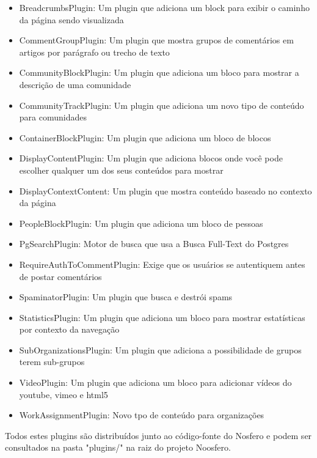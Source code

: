 \documentclass[11pt]{article}
\begin{document}
\begin{itemize}
  \item BreadcrumbsPlugin: Um plugin que adiciona um block para exibir o
    caminho da página sendo visualizada
  \item CommentGroupPlugin: Um plugin que mostra grupos de comentários em
    artigos por parágrafo ou trecho de texto
  \item CommunityBlockPlugin: Um plugin que adiciona um bloco para mostrar a
    descrição de uma comunidade
  \item CommunityTrackPlugin: Um plugin que adiciona um novo tipo de conteúdo
    para comunidades
  \item ContainerBlockPlugin: Um plugin que adiciona um bloco de blocos
  \item DisplayContentPlugin: Um plugin que adiciona blocos onde você pode
    escolher qualquer um dos seus conteúdos para mostrar
  \item DisplayContextContent: Um plugin que mostra conteúdo baseado no
    contexto da página
  \item PeopleBlockPlugin: Um plugin que adiciona um bloco de pessoas
  \item PgSearchPlugin: Motor de busca que usa a Busca Full-Text do Postgres
  \item RequireAuthToCommentPlugin: Exige que os usuários se autentiquem antes
    de postar comentários
  \item SpaminatorPlugin: Um plugin que busca e destrói spams
  \item StatisticsPlugin: Um plugin que adiciona um bloco para mostrar
    estatísticas por contexto da navegação
  \item SubOrganizationsPlugin: Um plugin que adiciona a possibilidade de
    grupos terem sub-grupos
  \item VideoPlugin: Um plugin que adiciona um bloco para adicionar vídeos do
    youtube, vimeo e html5
  \item WorkAssignmentPlugin: Novo tpo de conteúdo para organizações
\end{itemize}

Todos estes plugins são distribuídos junto ao código-fonte do Nosfero e podem
ser consultados na pasta "plugins/" na raiz do projeto Noosfero.

%
\end{document}
